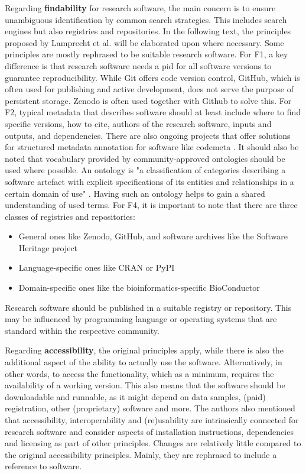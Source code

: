 Regarding \textbf{findability} for research software, the main concern is to ensure unambiguous identification by common search strategies. This includes search engines but also registries and repositories. In the following text, the principles proposed by Lamprecht et al. will be elaborated upon where necessary. Some principles are mostly rephrased to be suitable research software. For F1, a key difference is that research software needs a \acrshort{pid} for all software versions to guarantee reproducibility. While Git offers code version control, GitHub, which is often used for publishing and active development, does not serve the purpose of persistent storage. 
Zenodo is often used together with Github to solve this. 
For F2, typical metadata that describes software should at least include where to find specific versions, how to cite, authors of the research software, inputs and outputs, and dependencies. There are also ongoing projects that offer solutions for structured metadata annotation for software like codemeta \cite{noauthor_codemeta_2021}. It should also be noted that vocabulary provided by community-approved ontologies should be used where possible. An ontology is "a classification of categories describing a software artefact with explicit specifications of its entities and relationships in a certain domain of use" \cite{gruenpeter_morane_m215_2020}. Having such an ontology helps to gain a shared understanding of used terms. For F4, it is important to note that there are three classes of registries and repositories:
\begin{itemize}
    \item General ones like Zenodo, GitHub, and software archives like the Software Heritage project \cite{noauthor_opening_nodate}
    \item Language-specific ones like CRAN or PyPI
    \item Domain-specific ones like the bioinformatics-specific BioConductor \cite{noauthor_bioconductor_nodate}
\end{itemize}
Research software should be published in a suitable registry or repository. This may be influenced by programming language or operating systems that are standard within the respective community.

Regarding \textbf{accessibility}, the original principles apply, while there is also the additional aspect of the ability to actually use the software. Alternatively, in other words, to access the functionality, which as a minimum, requires the availability of a working version. This also means that the software should be downloadable and runnable, as it might depend on data samples, (paid) registration, other (proprietary) software and more. The authors also mentioned that accessibility, interoperability and (re)usability are intrinsically connected for research software and consider aspects of installation instructions, dependencies and licensing as part of other principles. Changes are relatively little compared to the original accessibility principles. Mainly, they are rephrased to include a reference to software.

